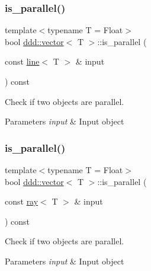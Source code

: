 \subsubsection{\texorpdfstring{is\+\_\+parallel()}{is\_parallel()}\hspace{0.1cm}{\footnotesize\ttfamily [2/5]}}
{\footnotesize\ttfamily template$<$typename T = Float$>$ \\
bool \hyperlink{classddd_1_1vector}{ddd\+::vector}$<$ T $>$\+::is\+\_\+parallel (\begin{DoxyParamCaption}\item[{const \hyperlink{classddd_1_1line}{line}$<$ T $>$ \&}]{input }\end{DoxyParamCaption}) const\hspace{0.3cm}{\ttfamily [inline]}}



Check if two objects are parallel. 


\begin{DoxyParams}{Parameters}
{\em input} & Input object \\
\hline
\end{DoxyParams}
\mbox{\label{classddd_1_1vector_a7557630d95edffd87fd4ddf15aecf460}} 
\subsubsection{\texorpdfstring{is\+\_\+parallel()}{is\_parallel()}\hspace{0.1cm}{\footnotesize\ttfamily [3/5]}}
{\footnotesize\ttfamily template$<$typename T = Float$>$ \\
bool \hyperlink{classddd_1_1vector}{ddd\+::vector}$<$ T $>$\+::is\+\_\+parallel (\begin{DoxyParamCaption}\item[{const \hyperlink{classddd_1_1ray}{ray}$<$ T $>$ \&}]{input }\end{DoxyParamCaption}) const\hspace{0.3cm}{\ttfamily [inline]}}



Check if two objects are parallel. 


\begin{DoxyParams}{Parameters}
{\em input} & Input object \\
\hline
\end{DoxyParams}
\mbox{\label{classddd_1_1vector_adf222e3911725f43cfd74418bb4ebb87}} 
